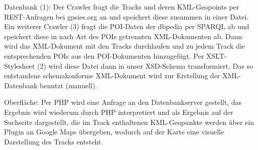 \documentclass[10pt,a4paper]{scrartcl}
\begin{document}
Datenbank (1): Der Crawler fragt die Tracks und deren KML-Geopoints per REST-Anfragen bei gpsies.org an und speichert diese zusammen in einer Datei. Ein weiterer Crawler (3) fragt die POI-Daten der dbpedia per SPARQL ab und speichert diese in nach Art des POIs getrennten XML-Dokumenten ab. Dann wird das XML-Dokument mit den Tracks durchlaufen und zu jedem Track die entsprechenden POIs aus den POI-Dokumenten hinzugefügt. Per XSLT-Stylesheet (2) wird diese Datei dann in unser XSD-Schema transformiert. Das so entstandene schemakonforme XML-Dokument wird zur Erstellung der XML-Datenbank benutzt (manuell).

Oberfläche: Per PHP wird eine Anfrage an den Datenbankserver gestellt, das Ergebnis wird wiederum durch PHP interpretiert und als Ergebnis auf der Suchseite dargestellt, die im Track enthaltenen KML-Geopunkte werden über ein Plugin an Google Maps übergeben, wodurch auf der Karte eine visuelle Darstellung des Tracks entsteht.


\end{document}
